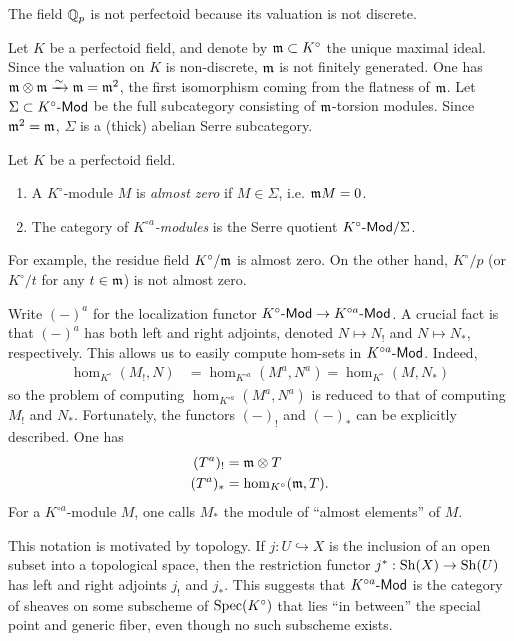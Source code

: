 \documentclass{article}
\begin{document}
\begin{example}
The field $\mathbb{Q}_p$ is not perfectoid because its valuation is not discrete. 
\end{example}

Let $K$ be a perfectoid field, and denote by $\mathfrak{m}\subset K^\circ$ the unique 
maximal ideal. Since the valuation on $K$ is non-discrete, $\mathfrak{m}$ is not 
finitely generated. One has $\mathfrak{m}\otimes \mathfrak{m} \xrightarrow\sim \mathfrak{m} = \mathfrak{m}^2$, the 
first isomorphism coming from the flatness of $\mathfrak{m}$. Let 
$\Sigma\subset K^\circ\textnormal{-}\mathsf{Mod}$ be the full subcategory consisting of $\mathfrak{m}$-torsion 
modules. Since $\mathfrak{m}^2=\mathfrak{m}$, $\Sigma$ is a (thick) abelian Serre subcategory. 

\begin{definition} 
Let $K$ be a perfectoid field. 
\begin{enumerate}
  \item A $K^\circ$-module $M$ is \emph{almost zero} if $M\in\Sigma$, i.e. $\mathfrak{m} M=0$. 
  \item The category of \emph{$K^{\circ a}$-modules} is the Serre quotient 
    $K^\circ\textnormal{-}\mathsf{Mod} / \Sigma$. 
\end{enumerate}
\end{definition}

For example, the residue field $K^\circ/\mathfrak{m}$ is almost zero. On the other hand, 
$K^\circ/p$ (or $K^\circ / t$ for any $t\in \mathfrak{m}$) is not almost zero.

Write $(-)^a$ for the localization functor $K^\circ\textnormal{-}\mathsf{Mod} \to K^{\circ a}\textnormal{-}\mathsf{Mod}$. 
A crucial fact is that $(-)^a$ has both left and right adjoints, denoted 
$N\mapsto N_!$ and $N\mapsto N_\ast$, respectively. This allows us to easily 
compute hom-sets in $K^{\circ a}\textnormal{-}\mathsf{Mod}$. Indeed, 
\begin{align*}
  \hom_{K^\circ}(M_!,N) &= \hom_{K^{\circ a}}(M^a,N^a) = \hom_{K^\circ}(M,N_\ast)
\end{align*}
so the problem of computing $\hom_{K^{\circ a}}(M^a,N^a)$ is reduced to that 
of computing $M_!$ and $N_\ast$. Fortunately, the functors $(-)_!$ and 
$(-)_\ast$ can be explicitly described. One has 
\begin{align*}
  (T^a)_! &= \mathfrak{m}\otimes T \\
  (T^a)_\ast &= \hom_{K^\circ}(\mathfrak{m},T) .
\end{align*}
For a $K^{\circ a}$-module $M$, one calls $M_\ast$ the module of ``almost 
elements'' of $M$. 

This notation is motivated by topology. If $j:U\hookrightarrow X$ is the 
inclusion of an open subset into a topological space, then the restriction 
functor $j^\ast:\operatorname{Sh}(X) \to \operatorname{Sh}(U)$ has left and right adjoints 
$j_!$ and $j_\ast$. This suggests that $K^{\circ a}\textnormal{-}\mathsf{Mod}$ is the category 
of sheaves on some subscheme of $\operatorname{Spec}(K^\circ)$ that lies ``in between'' 
the special point and generic fiber, even though no such subscheme exists. 
\end{document}
